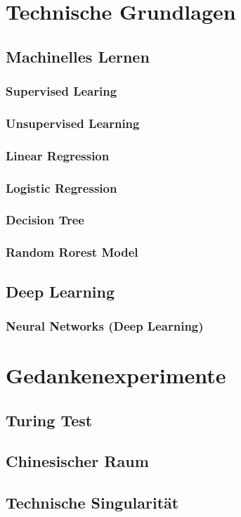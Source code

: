 \documentclass[12pt]{report}
\begin{document}
    \chapter{Technische Grundlagen}
    \section{Machinelles Lernen}
    \subsection{Supervised Learing}
    \subsection{Unsupervised Learning}
    \subsection{Linear Regression}
    \subsection{Logistic Regression}
    \subsection{Decision Tree}
    \subsection{Random Rorest Model}

    \section{Deep Learning}
    \subsection{Neural Networks (Deep Learning)}
    \chapter{Gedankenexperimente}
    \section{Turing Test}
    \cite{turing1950computing}
    \section{Chinesischer Raum}
    \section{Technische Singularität}


    \printbibliography
\end{document}
